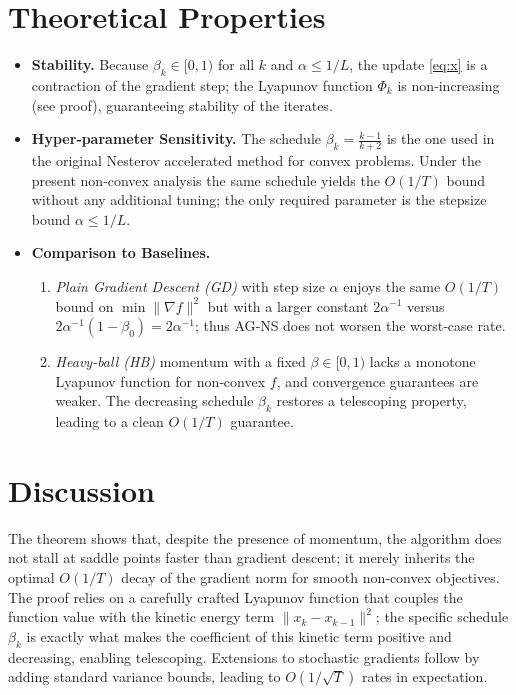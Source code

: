\documentclass{article}
\begin{document}
\section*{Theoretical Properties}
\begin{itemize}[leftmargin=*]
\item \textbf{Stability.} Because $\beta_k\in[0,1)$ for all $k$ and $\alpha\le 1/L$, the update \eqref{eq:x} is a contraction of the gradient step; the Lyapunov function $\Phi_k$ is non‑increasing (see proof), guaranteeing stability of the iterates.
\item \textbf{Hyper‑parameter Sensitivity.} The schedule $\beta_k=\frac{k-1}{k+2}$ is the one used in the original Nesterov accelerated method for convex problems. Under the present non‑convex analysis the same schedule yields the $O(1/T)$ bound without any additional tuning; the only required parameter is the stepsize bound $\alpha\le 1/L$.
\item \textbf{Comparison to Baselines.}
    \begin{enumerate}
        \item \emph{Plain Gradient Descent (GD)} with step size $\alpha$ enjoys the same $O(1/T)$ bound on $\min\|\nabla f\|^{2}$ but with a larger constant $2\alpha^{-1}$ versus $2\alpha^{-1}(1-\beta_0)=2\alpha^{-1}$; thus AG‑NS does not worsen the worst‑case rate.
        \item \emph{Heavy‑ball (HB)} momentum with a fixed $\beta\in[0,1)$ lacks a monotone Lyapunov function for non‑convex $f$, and convergence guarantees are weaker. The decreasing schedule $\beta_k$ restores a telescoping property, leading to a clean $O(1/T)$ guarantee.
    \end{enumerate}
\end{itemize}

\section*{Discussion}
The theorem shows that, despite the presence of momentum, the algorithm does not stall at saddle points faster than gradient descent; it merely inherits the optimal $O(1/T)$ decay of the gradient norm for smooth non‑convex objectives. The proof relies on a carefully crafted Lyapunov function that couples the function value with the kinetic energy term $\|x_k-x_{k-1}\|^{2}$; the specific schedule $\beta_k$ is exactly what makes the coefficient of this kinetic term positive and decreasing, enabling telescoping. Extensions to stochastic gradients follow by adding standard variance bounds, leading to $O(1/\sqrt{T})$ rates in expectation.
\end{document}
